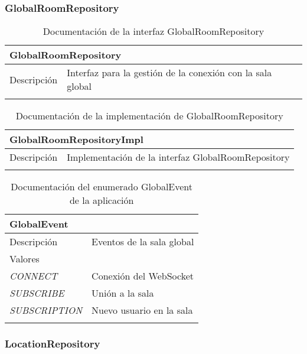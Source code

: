 \subsubsection{GlobalRoomRepository}

\begin{longtable}{|p{} p{}|}
    \hline
    \multicolumn{2}{|l|}{\textbf{GlobalRoomRepository}} \\ \hline \hline
    Descripción      & Interfaz para la gestión de la conexión con la sala global \\ \hline
    \caption{Documentación de la interfaz GlobalRoomRepository}
    \label{dis:app:global_room_repository}
\end{longtable}

\begin{longtable}{|p{} p{}|}
    \hline
    \multicolumn{2}{|l|}{\textbf{GlobalRoomRepositoryImpl}} \\ \hline \hline
    Descripción      & Implementación de la interfaz GlobalRoomRepository \\ \hline
    \caption{Documentación de la implementación de GlobalRoomRepository}
    \label{dis:app:global_room_repository_impl}
\end{longtable}

\begin{longtable}{|p{} p{}|}
    \hline
    \multicolumn{2}{|l|}{\textbf{GlobalEvent}} \\ \hline \hline
    Descripción      & Eventos de la sala global \\ \hline
    \multicolumn{2}{|l|}{Valores} \\
    \emph{CONNECT}  & Conexión del WebSocket  \\
    \emph{SUBSCRIBE}  & Unión a la sala  \\
    \emph{SUBSCRIPTION} & Nuevo usuario en la sala  \\ \hline
    \caption{Documentación del enumerado GlobalEvent de la aplicación}
    \label{dis:app:global_event}
\end{longtable}

\subsubsection{LocationRepository}

